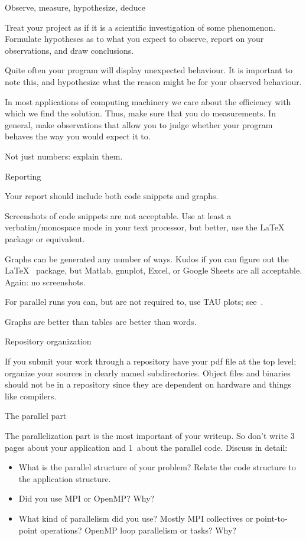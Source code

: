  {Observe, measure, hypothesize, deduce}

Treat 
your project as if it is a scientific investigation of some
phenomenon. Formulate hypotheses as to what you expect to observe,
report on your observations, and draw conclusions.

Quite often your program will display unexpected behaviour.
It is important to note this,
and hypothesize what the reason might be for your observed behaviour.

In most applications of computing machinery we care about the efficiency with which
we find the solution. Thus, make sure that you do measurements. In general, make
observations that allow you to judge whether your program behaves the way you
would expect it to.

\begin{tldr}
  Not just numbers: explain them.
\end{tldr}

 {Reporting}

Your report should
include both code snippets and graphs.

Screenshots of code snippets are not acceptable.
Use at least a verbatim/monospace mode in your text processor,
but better, use the \LaTeX\  package or equivalent.

Graphs can be generated any number of ways.
Kudos if you can figure out the \LaTeX\  package,
but Matlab, gnuplot, Excel, or Google Sheets are all  acceptable.
Again: no screenshots.

For parallel runs you can, but are not required to,
use TAU plots; see~.

\begin{tldr}
  Graphs are better than tables are better than words.
\end{tldr}

 {Repository organization}

If you submit your work through a repository
have your pdf file at the top level;
organize your sources in clearly named subdirectories.
Object files and binaries should not be in a repository
since they are dependent on hardware and things like compilers.

 {The parallel part}

The parallelization part is the most important of your writeup.
So don't write 3 pages about your application and 1~about the parallel code.
Discuss in detail:
\begin{itemize}
\item What is the parallel structure of your problem?
  Relate the code structure to the application structure.
\item Did you use MPI or OpenMP? Why?
\item What kind of parallelism did you use? Mostly MPI collectives or point-to-point operations?
  OpenMP loop parallelism or tasks? Why?
\end{itemize}

